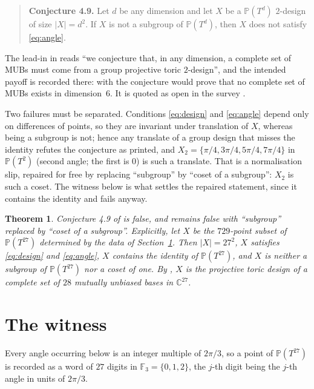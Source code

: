 \documentclass[11pt]{amsart}
\newtheorem{theorem}{Theorem}[section]
\theoremstyle{remark}
\newcommand{\Fq}{\mathbb{F}}
\begin{document}
\begin{quote}
\textbf{Conjecture 4.9.}
Let $d$ be any dimension and let $X$ be a $\mathbb P(T^{d})$ $2$-design of size
$|X|=d^{2}$. If $X$ is not a subgroup of $\mathbb P(T^{d})$, then $X$ does not
satisfy \eqref{eq:angle}.
\end{quote}

\noindent
The lead-in in \cite{IMEG} reads ``we conjecture that, in any dimension, a
complete set of MUBs must come from a group projective toric $2$-design'', and
the intended payoff is recorded there: with \cite[Proposition 4.6]{IMEG} the
conjecture would prove that no complete set of MUBs exists in dimension~$6$. It
is quoted as open in the survey \cite{MW}.

Two failures must be separated. Conditions \eqref{eq:design} and \eqref{eq:angle}
depend only on differences of points, so they are invariant under translation of
$X$, whereas being a subgroup is not; hence any translate of a group design that
misses the identity refutes the conjecture as printed, and
$X_{2}=\{\pi/4,3\pi/4,5\pi/4,7\pi/4\}$ in $\mathbb P(T^{2})$ (second angle; the
first is $0$) is such a translate. That is a normalisation slip, repaired for
free by replacing ``subgroup'' by ``coset of a subgroup'': $X_{2}$ is such a
coset. The
witness below is what settles the repaired statement, since it contains the
identity and fails anyway.

\begin{theorem}\label{thm:main}
Conjecture 4.9 of \textup{\cite{IMEG}} is false, and remains false with
``subgroup'' replaced by ``coset of a subgroup''. Explicitly, let $X$ be the
$729$-point subset of $\mathbb P(T^{27})$ determined by the data of
Section~\textup{\ref{sec:witness}}. Then $|X|=27^{2}$, $X$ satisfies
\eqref{eq:design} and \eqref{eq:angle}, $X$ contains the identity of
$\mathbb P(T^{27})$, and $X$ is neither a subgroup of $\mathbb P(T^{27})$ nor a
coset of one. By \textup{\cite[Theorem 4.4]{IMEG}}, $X$ is the projective toric
design of a complete set of $28$ mutually unbiased bases in $\mathbb C^{27}$.
\end{theorem}

\section{The witness}\label{sec:witness}

Every angle occurring below is an integer multiple of $2\pi/3$, so a point of
$\mathbb P(T^{27})$ is recorded as a word of $27$ digits in
$\Fq_{3}=\{0,1,2\}$, the $j$-th digit being the $j$-th angle in units of
$2\pi/3$.
\end{document}
